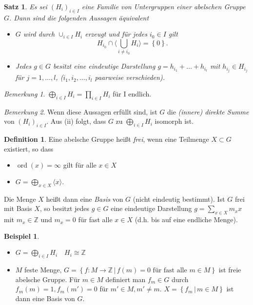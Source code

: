\documentclass[12pt]{scrartcl} %
\newtheorem{thm}{Satz}
\theoremstyle{definition}
\newtheorem*{defn}{Definition}
\newtheorem{ex}{Beispiel}
\theoremstyle{remark}
\newtheorem*{nb}{Bemerkung}
\begin{document}
\begin{thm}
  Es sei $(H_i)_{i \in I}$ eine Familie von Untergruppen einer abelschen Gruppe $G$. Dann sind die folgenden Aussagen äquivalent
\begin{itemize}
  \item[(i)]  $G$ wird durch $\cup_{i \in I} H_i$ erzeugt und für jedes $i_0 \in I$ gilt 
    \[ H_{i_0} \cap \langle \bigcup_{i \neq i_0} H_i \rangle = \left\{ 0 \right\}. \]
  \item Jedes $g \in G$ besitzt eine eindeutige Darstellung $g = h_{i_1} + \dots + h_{i_l}$ mit $h_{i_j} \in H_{i_j}$ für $j = 1,\dots,l$, ($i_1,i_2,\dots,i_l$ paarweise verschieden).
\end{itemize}
\end{thm}

\begin{nb}
  $ \bigoplus_{i \in I} H_i = \prod_{i \in I} H_i $ für I endlich.
\end{nb}

\begin{nb}
  Wenn diese Aussagen erfüllt sind, ist $G$ die \emph{(innere) direkte Summe} von $(H_i)_{i \in I}$. Aus (ii) folgt, dass $G$ zu $\bigoplus_{i \in I} H_i$ isomorph ist. 
\end{nb}

\begin{defn}
  Eine abelsche Gruppe heißt \emph{frei}, wenn eine Teilmenge $X \subset G$ existiert, so dass
  \begin{itemize}
    \item[(i)] $\operatorname{ord}(x) = \infty$ gilt für alle $x \in X$
    \item[(ii)] $G = \bigoplus_{x \in X} \langle x \rangle$.
  \end{itemize}

  Die Menge $X$ heißt dann eine \emph{Basis} von $G$ (nicht eindeutig bestimmt). Ist $G$ frei mit Basis $X$, so besitzt jedes $g \in G$ eine eindeutige Darstellung $g = \sum_{x \in X} m_x x$ mit $m_x \in \mathbb{Z}$ und $m_x = 0$ für fast alle $x \in X$ (d.h. bis auf eine endliche Menge).
\end{defn}

\begin{ex}
  \begin{itemize}
    \item $G = \bigoplus_{i \in I} H_i \quad H_i \cong \mathbb{Z}$
    \item $M$ feste Menge, $G = \left\{ f : M \to \mathbb{Z} \,|\, f(m) = 0 \text{ für fast alle } m \in M \right\}$ ist freie abelsche Gruppe.  Für $m \in M$ definiert man $f_m \in G$ durch $f_m(m) = 1, f_m(m') = 0$ für $m' \in M, m' \neq m$. $X = \left\{ f_m \,|\, m \in M \right\}$ ist dann eine Basis von $G$.
  \end{itemize}
\end{ex}
\end{document}
